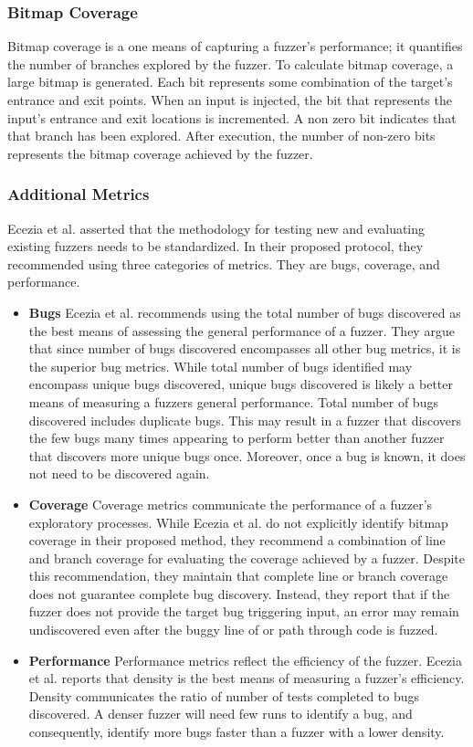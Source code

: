\subsubsection{Bitmap Coverage}
Bitmap coverage is a one means of capturing a fuzzer's performance; it quantifies the number of
 branches explored by the fuzzer. To calculate bitmap coverage, a large bitmap is generated. Each bit 
 represents some combination of the target's entrance and exit points. When an input is injected, the 
 bit that represents the input's entrance and exit locations is incremented. A non zero bit indicates 
 that that branch has been explored. After execution, the number of non-zero bits represents the 
 bitmap coverage achieved by the fuzzer. \cite{AFLGitHub}

\subsubsection{Additional Metrics}
Ecezia et al. asserted that the methodology for testing new and evaluating 
existing fuzzers needs to be standardized. In their proposed protocol, 
they recommended using three categories of metrics. They are bugs, 
coverage, and performance. 

\begin{itemize}
    \item \textbf{Bugs} Ecezia et al. recommends using the total number of
    bugs discovered as the best means of assessing the general performance 
    of a fuzzer. They argue that since number of bugs discovered 
    encompasses all other bug metrics, it is the superior bug metrics. 
    While total number of bugs identified may encompass unique bugs 
    discovered, unique bugs discovered is likely a better means of 
    measuring a fuzzers general performance. Total number of bugs 
    discovered includes duplicate bugs. This may result in a fuzzer that 
    discovers the few bugs many times appearing to perform better than 
    another fuzzer that discovers more unique bugs once. Moreover, once a 
    bug is known, it does not need to be discovered again.
    \item \textbf{Coverage} Coverage metrics communicate the performance 
    of a fuzzer's exploratory processes. While Ecezia et al. do not 
    explicitly identify bitmap coverage in their proposed method, they 
    recommend a combination of line and branch coverage for evaluating the 
    coverage achieved by a fuzzer. Despite this recommendation, they 
    maintain that complete line or branch coverage does not guarantee 
    complete bug discovery. Instead, they report that if the fuzzer does 
    not provide the target bug triggering input, an error may remain 
    undiscovered even after the buggy line of or path through code is 
    fuzzed. 
    \item \textbf{Performance} Performance metrics reflect the efficiency 
    of the fuzzer. Ecezia et al. reports that density is the best means of 
    measuring a fuzzer's efficiency. Density communicates the ratio of 
    number of tests completed to bugs discovered. A denser fuzzer will 
    need few runs to identify a bug, and consequently, identify more bugs 
    faster than a fuzzer with a lower density. 
\end{itemize}

